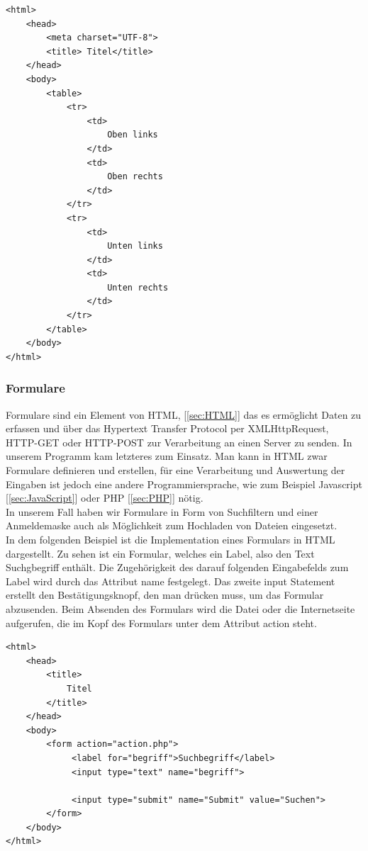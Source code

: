 \documentclass[12pt,a4paper,bibliography=totocnumbered,listof=totocnumbered]{scrartcl}
\begin{document}
\vspace{1em}
\begin{lstlisting}[caption= Beispiel für Tabellen in HTML, label=lst:HTML]
<html>
	<head>
		<meta charset="UTF-8">		
		<title> Titel</title>
	</head>
	<body>
		<table>
			<tr>
				<td>
					Oben links
				</td>
				<td>
					Oben rechts
				</td>
			</tr>
			<tr>
				<td>
					Unten links
				</td>
				<td>
					Unten rechts
				</td>
			</tr>
		</table>
	</body>
</html>
\end{lstlisting}

\subsubsection{Formulare}
\label{sec:Formulare}
Formulare sind ein Element von HTML, [\ref{sec:HTML}] das es ermöglicht Daten zu erfassen und über das Hypertext Transfer Protocol per XMLHttpRequest, HTTP-GET oder HTTP-POST zur Verarbeitung an einen Server zu senden.\cite{Webformular} In unserem Programm kam letzteres zum Einsatz. Man kann in HTML zwar Formulare definieren und erstellen, für eine Verarbeitung und Auswertung der Eingaben ist jedoch eine andere Programmiersprache, wie zum Beispiel Javascript [\ref{sec:JavaScript}] oder PHP [\ref{sec:PHP}] nötig.\cite{HTML/Formulare/Form} \\
In unserem Fall haben wir Formulare in Form von Suchfiltern und einer Anmeldemaske auch als Möglichkeit zum Hochladen von Dateien eingesetzt.\\
In dem folgenden Beispiel ist die Implementation eines Formulars in HTML dargestellt. Zu sehen ist ein Formular, welches ein Label, also den Text \glqq Suchgbegriff\grqq{} enthält. Die Zugehörigkeit des darauf folgenden Eingabefelds zum Label wird durch das Attribut \glqq name\grqq{} festgelegt. Das zweite \glqq input\grqq{} Statement erstellt den Bestätigungsknopf, den man drücken muss, um das Formular abzusenden. Beim Absenden des Formulars wird die Datei oder die Internetseite aufgerufen, die im Kopf des Formulars unter dem Attribut \glqq action\grqq{} steht.

\vspace{1em}
\begin{lstlisting}[caption= Beispiel für Formulare in HTML, label=lst:HTML]
<html>
	<head>
		<title>
			Titel
		</title>
	</head>
	<body>
		<form action="action.php">
 			 <label for="begriff">Suchbegriff</label>
	 		 <input type="text" name="begriff">
	 		 
	 		 <input type="submit" name="Submit" value="Suchen">
		</form>
	</body>
</html>
\end{lstlisting}
\end{document}
